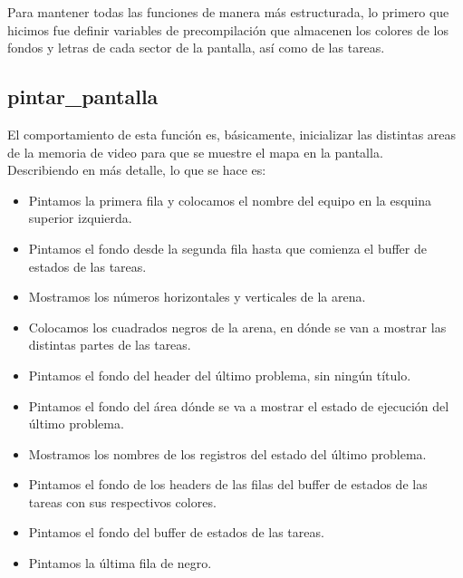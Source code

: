 Para mantener todas las funciones de manera más estructurada, lo primero que hicimos fue definir variables de precompilación que almacenen los colores de los fondos y letras de cada sector de la pantalla, así como de las tareas.\\

\subsection{pintar\_pantalla}
El comportamiento de esta función es, básicamente, inicializar las distintas areas de la memoria de video para que se muestre el mapa en la pantalla.\\
Describiendo en más detalle, lo que se hace es:
\begin{itemize}
 \item Pintamos la primera fila y colocamos el nombre del equipo en la esquina superior izquierda.
 \item Pintamos el fondo desde la segunda fila hasta que comienza el buffer de estados de las tareas.
 \item Mostramos los números horizontales y verticales de la arena.
 \item Colocamos los cuadrados negros de la arena, en dónde se van a mostrar las distintas partes de las tareas.
 \item Pintamos el fondo del header del último problema, sin ningún título.
 \item Pintamos el fondo del área dónde se va a mostrar el estado de ejecución del último problema.
 \item Mostramos los nombres de los registros del estado del último problema.
 \item Pintamos el fondo de los headers de las filas del buffer de estados de las tareas con sus respectivos colores.
 \item Pintamos el fondo del buffer de estados de las tareas.
 \item Pintamos la última fila de negro.
\end{itemize}


